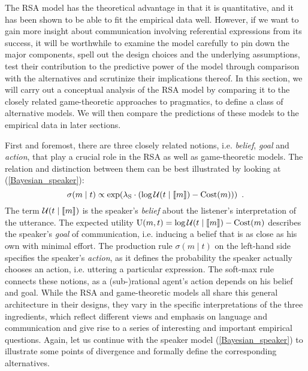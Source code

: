 \label{sec:alternatives}

The RSA model has the theoretical advantage in that it is quantitative, and it has been shown to be able to fit the empirical data well. However, if we want to gain more insight about communication involving referential expressions from its success, it will be worthwhile to examine the model carefully to pin down the major components, spell out the design choices and the underlying assumptions, test their contribution to the predictive power of the model through comparison with the alternatives and scrutinize their implications thereof. In this section, we will carry out a conceptual analysis of the RSA model by comparing it to the closely related game-theoretic approaches to pragmatics, to define a class of alternative models. We will then compare the predictions of these models to the empirical data in later sections. 

First and foremost, there are three closely related notions, i.e. \emph{belief}, \emph{goal} and \emph{action}, that play a crucial role in the RSA as well as game-theoretic models. The relation and distinction between them can be best illustrated by looking at (\ref{Bayesian_speaker}):
$$\sigma(m \mid t) \propto \exp(\lambda_\mathrm{S} \cdot (\log \mathcal{U}(t\mid \llbracket m \rrbracket)-\mbox{Cost}(m))) \enspace .$$
The term $\mathcal{U}(t\mid \llbracket m \rrbracket)$ is the speaker's \emph{belief} about the listener's interpretation of the utterance. The expected utility $\mbox{U}(m,t)=\log \mathcal{U}(t\mid \llbracket m \rrbracket)-\mbox{Cost}(m)$ describes the speaker's \emph{goal} of communication, i.e. inducing a belief that is as close as his own with minimal effort. The production rule $\sigma(m \mid t)$ on the left-hand side specifies the speaker's \emph{action}, as it defines the probability the speaker actually chooses an action, i.e. uttering a particular expression. The soft-max rule connects these notions, as a (sub-)rational agent's action depends on his belief and goal. While the RSA and game-theoretic models all share this general architecture in their designs, they vary in the specific interpretations of the three ingredients, which reflect different views and emphasis on language and communication and give rise to a series of interesting and important empirical questions. Again, let us continue with the speaker model (\ref{Bayesian_speaker}) to illustrate some points of divergence and formally define the corresponding alternatives.

